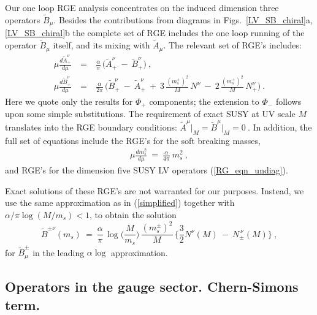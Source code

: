\documentclass[12pt]{revtex4}
\begin{document}
Our one loop RGE analysis concentrates on the induced dimension three 
operators $ \widetilde{B}_\mu $. Besides the contributions from
diagrams in Figs.~\ref{LV_SB_chiral}a, \ref{LV_SB_chiral}b the 
complete set of RGE includes the one loop running of the operator $
\widetilde{B}_\mu $ itself, and its mixing with $ \widetilde{A}_\mu $.
The relevant set of RGE's includes: 
\begin{eqnarray}
\label{RG_AB}
\nonumber
\mu\frac{d \widetilde{A}_+^\nu}{d\mu} 
& ~=~ &
\frac{\alpha}{\pi} \,  \Big(  \widetilde{A}_+^\nu  
~-~\widetilde{B}_+^\nu \Big)~, 
        \\
\mu\frac{d \widetilde{B}_+^\nu}{d\mu} 
& ~=~ &
\frac{\alpha}{2\pi} \, \Big(
\widetilde{B}_+^\nu  ~-~ \widetilde{A}_+^\nu  
~+~3\, \frac{(m_s^+)^2}{M}\, N^\nu 
~-~2\, \frac{(m_s^+)^2}{M}\, N_+^\nu 
\Big)~.
\end{eqnarray}
%
Here we quote only the results for $\Phi_+$ components; the extension
to $\Phi_-$ follows upon some simple substitutions. The requirement of
exact SUSY at UV scale $M$ translates into the RGE boundary
conditions:
\( 
\widetilde{A}^\mu \Bigr|_M = \widetilde{B}^\mu \Bigr|_M = 0~.
\) 
In addition, the full set of equations include the RGE's for the soft breaking masses, 
%
\begin{eqnarray}
       \mu \frac{d m_s^2}
               {d\mu}            ~ =~ 
        \frac{\alpha}{4\pi}~ m_s^2~,
\end{eqnarray}
%
and RGE's for the dimension five SUSY LV operators
(\ref{RG_eqn_undiag}).   

Exact solutions of these RGE's are not
warranted for our purposes. Instead, we use the same approximation as
in (\ref{simplified}) together with  
$ \alpha/\pi \log (M/m_s) < 1$,
to obtain the solution 
\begin{equation}
\label{B_mu_coef}
\widetilde{B}^{\pm\nu} (m_s) ~=~ \frac{\alpha}{\pi}\, 
\log \big(\frac{M}{m_s}\big)\,
\frac{(m_{s}^\pm)^2 }{M}\, 
\Big\{ 
\frac{3}
     {2} N^\nu(M) 
~-~ N_\pm^{\,\nu}(M)
\Big\}~,
\end{equation}
%
for $\widetilde{B}^\pm_\mu$ in the leading 
$\alpha\log$ approximation.




\subsection{Operators in the gauge sector. Chern-Simons term.}
\label{SB_gauge_sector}
   
\end{document}
